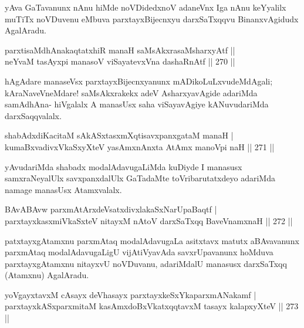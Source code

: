 \begin{artha}
yAva GaTavanunx nAnu hiMde noVDidedxnoV adaneVnx Iga nAnu keYyalilx muTiTx noVDuvenu eMbuva parxtayxBijecnxyu darxSaTxqqvu BinanxvAgidudx AgalAradu.
\end{artha}


\begin{shl}
parxtisaMdhAnakaqtatxhiR manaH saMsAkxrasaMsharxyAtf ||  \\
neYvaM tasAyxpi manasoV viSayatevxVna dashaRnAtf \hfill ||  270 ||  
\end{shl}

\begin{artha}
hAgAdare manaseVsx parxtayxBijecnxyanunx mADikoLuLxvudeMdAgali; kAraNaveVneMdare! saMsAkxrakekx adeV AsharxyavAgide adariMda samAdhAna- hiVgalalx A manasUsx saha viSayavAgiye kANuvudariMda darxSaqqvalalx.
\end{artha}


\begin{shl}
shabAdxdiKacitaM sAkASxtasxmXqtisavxpanxgataM manaH | \\
kumaBxvadivxVkaSxyXteV yasAmxnAnxta AtAmx manoV\s pi naH \hfill ||  271 ||  
\end{shl}

\begin{artha}
yAvudariMda shabadx modalAdavugaLiMda kuDiyde I manasusx samxraNeyalUlx savxpanxdalUlx GaTadaMte toVribarutatxdeyo adariMda namage manasUsx Atamxvalalx.
\end{artha}

\begin{shl}
BAvABAvw parxmAtArxdeVsatxdivxlakaSxNarUpaBaqtf | \\
parxtayxkasxmiVkaSxteV nitayxM nAtoV darxSaTxqq BaveVnamxnaH \hfill ||  272 ||  
\end{shl}

\begin{artha}
patxtayxgAtamxnu parxmAtaq modalAdavugaLa asitxtavx matutx aBAvavanunx parxmAtaq modalAdavugaLigU vijAtiVyavAda savxrUpavanunx hoMduva parxtayxgAtamxnu nitayxvU noVDuvanu, adariMdalU manasusx darxSaTxqq (Atamxnu) AgalAradu.
\end{artha}

\begin{shl}
yoVgayxtavxM cAsayx deVhasayx parxtayxkeSxYkaparxmANakamf | \\
parxtayxkASxparxmitaM kasAmxdoBxVkatxqqtavxM tasayx kalapxyXteV \hfill ||  273 ||  
\end{shl}

